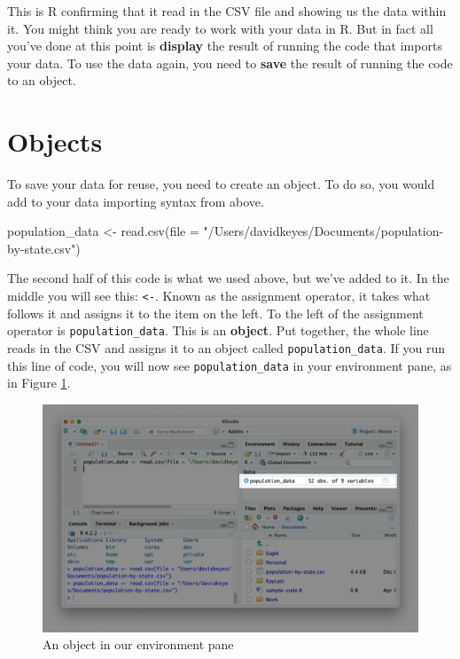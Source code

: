 \documentclass[
]{book}
\newenvironment{Shaded}{\begin{snugshade}}{\end{snugshade}}
\newcommand{\AttributeTok}[1]{\textcolor[rgb]{0.77,0.63,0.00}{#1}}
\newcommand{\FunctionTok}[1]{\textcolor[rgb]{0.00,0.00,0.00}{#1}}
\newcommand{\NormalTok}[1]{#1}
\newcommand{\OtherTok}[1]{\textcolor[rgb]{0.56,0.35,0.01}{#1}}
\newcommand{\StringTok}[1]{\textcolor[rgb]{0.31,0.60,0.02}{#1}}
\begin{document}
This is R confirming that it read in the CSV file and showing us the data within it. You might think you are ready to work with your data in R. But in fact all you've done at this point is \textbf{display} the result of running the code that imports your data. To use the data again, you need to \textbf{save} the result of running the code to an object.

\hypertarget{objects}{%
\section*{Objects}\label{objects}}

To save your data for reuse, you need to create an object. To do so, you would add to your data importing syntax from above.

\begin{Shaded}
\begin{Highlighting}[]
\NormalTok{population\_data }\OtherTok{\textless{}{-}} \FunctionTok{read.csv}\NormalTok{(}\AttributeTok{file =} \StringTok{"/Users/davidkeyes/Documents/population{-}by{-}state.csv"}\NormalTok{)}
\end{Highlighting}
\end{Shaded}

The second half of this code is what we used above, but we've added to it. In the middle you will see this: \texttt{\textless{}-}. Known as the assignment operator, it takes what follows it and assigns it to the item on the left. To the left of the assignment operator is \texttt{population\_data}. This is an \textbf{object}. Put together, the whole line reads in the CSV and assigns it to an object called \texttt{population\_data}. If you run this line of code, you will now see \texttt{population\_data} in your environment pane, as in Figure \ref{fig:population-data-environment}.

\begin{figure}
\includegraphics[width=1\linewidth]{assets/population-data-environment} \caption{An object in our environment pane}\label{fig:population-data-environment}
\end{figure}
\end{document}
